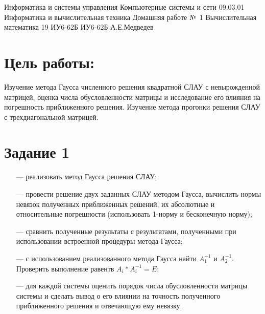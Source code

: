 \documentclass{bmstu}
\begin{document}


\renewcommand\thefigure{\arabic{figure}}
 
\def\numberWork{1}

\makereporttitle
    {Информатика и системы управления} %
    {Компьютерные системы и сети} %
    {09.03.01 Информатика и вычислительная техника} %
    {Домашняя работе №~1} %
    {} %
    {Вычислительная математика} %
    {19} %
    {ИУ6-62Б} %
    {
    	{ИУ6-62Б}
    	{А.Е.Медведев} %
    	{} %
    } 
    

\section*{Цель работы:}
Изучение метода Гаусса численного решения квадратной СЛАУ с
невырожденной матрицей, оценка числа обусловленности матрицы и исследование его
влияния на погрешность приближенного решения. Изучение метода прогонки решения
СЛАУ с трехдиагональной матрицей.

\section*{Задание 1}
\begin{enumerate}
\item[---] реализовать метод Гаусса решения СЛАУ;
\item[---] провести решение двух заданных СЛАУ методом Гаусса, вычислить нормы невязок
полученных приближенных решений, их абсолютные и относительные погрешности
(использовать 1-норму и бесконечную норму);
\item[---] сравнить полученные результаты с результатами, полученными при использовании
встроенной процедуры метода Гаусса;
\item[---] с использованием реализованного метода Гаусса найти $A_1^{-1}$ и $A_2^{-1}$. Проверить
выполнение равентв $A_i*A_i^{-1} = E$;
\item[---] для каждой системы оценить порядок числа обусловленности матрицы системы и
сделать вывод о его влиянии на точность полученного приближенного решения и
отвечающую ему невязку.
\end{enumerate}
\end{document}
